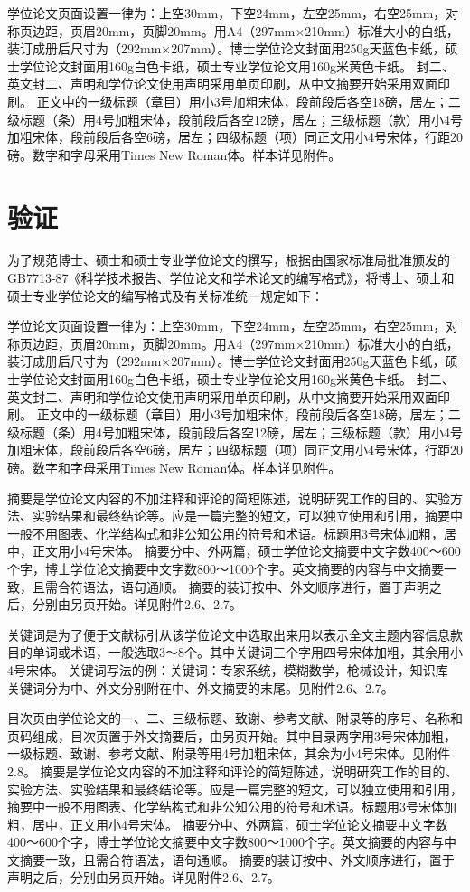 {	学位论文页面设置一律为：上空30mm，下空24mm，左空25mm，右空25mm，对称页边距，页眉20mm，页脚20mm。用A4（297mm×210mm）标准大小的白纸，装订成册后尺寸为（292mm×207mm）。博士学位论文封面用250g天蓝色卡纸，硕士学位论文封面用160g白色卡纸，硕士专业学位论文用160g米黄色卡纸。
	封二、英文封二、声明和学位论文使用声明采用单页印刷，从中文摘要开始采用双面印刷。
	正文中的一级标题（章目）用小3号加粗宋体，段前段后各空18磅，居左；二级标题（条）用4号加粗宋体，段前段后各空12磅，居左；三级标题（款）用小4号加粗宋体，段前段后各空6磅，居左；四级标题（项）同正文用小4号宋体，行距20磅。数字和字母采用Times New Roman体。样本详见附件。
	
}
\chapter{验证}{
	为了规范博士、硕士和硕士专业学位论文的撰写，根据由国家标准局批准颁发的GB7713-87《科学技术报告、学位论文和学术论文的编写格式》，将博士、硕士和硕士专业学位论文的编写格式及有关标准统一规定如下：
	
	学位论文页面设置一律为：上空30mm，下空24mm，左空25mm，右空25mm，对称页边距，页眉20mm，页脚20mm。用A4（297mm×210mm）标准大小的白纸，装订成册后尺寸为（292mm×207mm）。博士学位论文封面用250g天蓝色卡纸，硕士学位论文封面用160g白色卡纸，硕士专业学位论文用160g米黄色卡纸。
	封二、英文封二、声明和学位论文使用声明采用单页印刷，从中文摘要开始采用双面印刷。
	正文中的一级标题（章目）用小3号加粗宋体，段前段后各空18磅，居左；二级标题（条）用4号加粗宋体，段前段后各空12磅，居左；三级标题（款）用小4号加粗宋体，段前段后各空6磅，居左；四级标题（项）同正文用小4号宋体，行距20磅。数字和字母采用Times New Roman体。样本详见附件。
	
	摘要是学位论文内容的不加注释和评论的简短陈述，说明研究工作的目的、实验方法、实验结果和最终结论等。应是一篇完整的短文，可以独立使用和引用，摘要中一般不用图表、化学结构式和非公知公用的符号和术语。标题用3号宋体加粗，居中，正文用小4号宋体。
	摘要分中、外两篇，硕士学位论文摘要中文字数400～600个字，博士学位论文摘要中文字数800～1000个字。英文摘要的内容与中文摘要一致，且需合符语法，语句通顺。
	摘要的装订按中、外文顺序进行，置于声明之后，分别由另页开始。详见附件2.6、2.7。
	
	关键词是为了便于文献标引从该学位论文中选取出来用以表示全文主题内容信息款目的单词或术语，一般选取3～8个。其中关键词三个字用四号宋体加粗，其余用小4号宋体。
	关键词写法的例：关键词：专家系统，模糊数学，枪械设计，知识库
	关键词分为中、外文分别附在中、外文摘要的末尾。见附件2.6、2.7。
	
	目次页由学位论文的一、二、三级标题、致谢、参考文献、附录等的序号、名称和页码组成，目次页置于外文摘要后，由另页开始。其中目录两字用3号宋体加粗，一级标题、致谢、参考文献、附录等用4号加粗宋体，其余为小4号宋体。见附件2.8。
	摘要是学位论文内容的不加注释和评论的简短陈述，说明研究工作的目的、实验方法、实验结果和最终结论等。应是一篇完整的短文，可以独立使用和引用，摘要中一般不用图表、化学结构式和非公知公用的符号和术语。标题用3号宋体加粗，居中，正文用小4号宋体。
	摘要分中、外两篇，硕士学位论文摘要中文字数400～600个字，博士学位论文摘要中文字数800～1000个字。英文摘要的内容与中文摘要一致，且需合符语法，语句通顺。
	摘要的装订按中、外文顺序进行，置于声明之后，分别由另页开始。详见附件2.6、2.7。
}